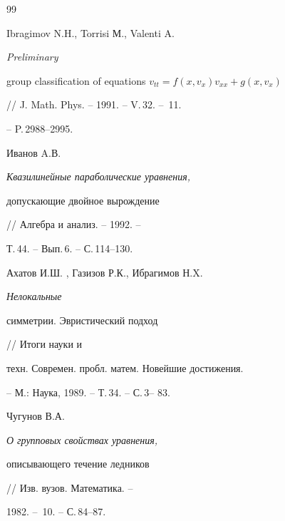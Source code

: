 \begin{thebibliography}{99}


Ibragimov N.H., Torrisi М., Valenti A. {\em Preliminary 


group classification of equations $v_{tt}=f(x,v_x)v_{xx}+ g(x,v_x)$} 


// J. Math. Phys. -- 1991. -- V.\,32. -- \No\,11. 


-- P.\,2988--2995. 




Иванов A.В. {\em Квазилинейные параболические уравнения, 


допускающие двойное вырождение} // Алгебра и анализ. -- 1992. -- 


Т.\,44. -- Вып.\,6. -- С.\,114--130. 




Ахатов И.Ш. , Газизов Р.К., Ибрагимов Н.X. {\em Нелокальные 


симметрии. Эвристический подход} // Итоги науки и 


техн. Современ. пробл. матем. Новейшие достижения. 


-- М.: Наука, 1989. -- Т.\,34. -- С.\,3-- 83. 




Чугунов В.А. {\em О групповых свойствах уравнения, 


описывающего течение ледников} // Изв. вузов. Математика. -- 


1982. -- \No\,10. -- С.\,84--87. 


 


 


\end{thebibliography} 


 


\vskip 2cm 


 








 


 


\label{end} 


 


